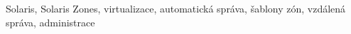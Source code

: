 Solaris, Solaris Zones, virtualizace, automatická správa, šablony zón, vzdálená správa, administrace
